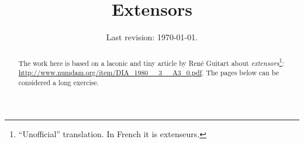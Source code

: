 



\title{Extensors}
\author{}
\date{Last revision: \today{}.}



\maketitle

\begin{abstract}
The work here is based on a laconic and tiny article by \textfrench{René Guitart} about {\em extensors}\footnote{\enquote{Unofficial} translation. In French it is \textfrench{extenseurs}.}: \url{http://www.numdam.org/item/DIA_1980__3__A3_0.pdf}. The pages below can be considered a long exercise.
\end{abstract}

\tableofcontents

\printbibliography






